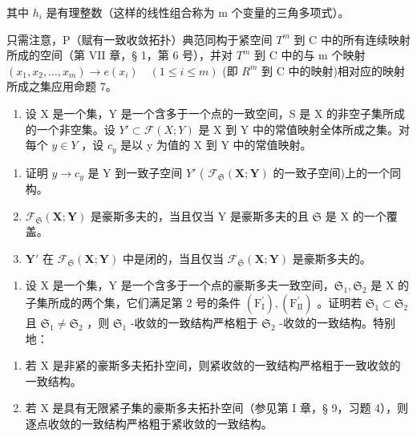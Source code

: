 其中 \(h_{i}\) 是有理整数（这样的线性组合称为 m 个变量的三角多项式）。

只需注意，P（赋有一致收敛拓扑）典范同构于紧空间 \(T^{m}\) 到 C 中的所有连续映射所成的空间（第 VII 章，§ 1，第 6 号），并对 \(T^{m}\) 到 C 中的与 m 个映射 \((x_{1}, x_{2}, \ldots, x_{m}) \to e(x_{i}) \quad (1 \leqslant i \leqslant m)\) (即 \(R^{m}\) 到 C 中的映射)相对应的映射所成之集应用命题 7。

\ExerciseGroupsStart

\ExerciseSection

\begin{enumerate}
\def\labelenumi{\arabic{enumi})}
\tightlist
\item
  设 X 是一个集，Y 是一个含多于一个点的一致空间，S 是 X 的非空子集所成的一个非空集。设 \(Y' \subset \mathcal{F}(X; Y)\) 是 X 到 Y 中的常值映射全体所成之集。对每个 \(y \in Y\) ，设 \(c_{y}\) 是以 y 为值的 X 到 Y 中的常值映射。
\end{enumerate}

\begin{enumerate}
\def\labelenumi{\alph{enumi})}
\item
  证明 \(y \to c_{y}\) 是 Y 到一致子空间 \(Y'\) ( \(\mathcal{F}_{\mathfrak{S}}(\mathbf{X}; \mathbf{Y})\) 的一致子空间)上的一个同构。
\item
  \(\mathcal{F}_{\mathfrak{S}}(\mathbf{X};\mathbf{Y})\) 是豪斯多夫的，当且仅当 Y 是豪斯多夫的且 \(\mathfrak{S}\) 是 X 的一个覆盖。
\item
  \(\mathbf{Y}'\) 在 \(\mathcal{F}_{\mathfrak{S}}(\mathbf{X};\mathbf{Y})\) 中是闭的，当且仅当 \(\mathcal{F}_{\mathfrak{S}}(\mathbf{X};\mathbf{Y})\) 是豪斯多夫的。
\end{enumerate}

\begin{enumerate}
\def\labelenumi{\arabic{enumi})}
\setcounter{enumi}{1}
\tightlist
\item
  设 X 是一个集，Y 是一个含多于一个点的豪斯多夫一致空间，\(\mathfrak{S}_1, \mathfrak{S}_2\) 是 X 的子集所成的两个集，它们满足第 2 号的条件 \((\mathrm{F}_{\mathrm{I}}^{\prime}), (\mathrm{F}_{\mathrm{II}}^{\prime})\) 。证明若 \(\mathfrak{S}_1 \subset \mathfrak{S}_2\) 且 \(\mathfrak{S}_1 \neq \mathfrak{S}_2\) ，则 \(\mathfrak{S}_1\) -收敛的一致结构严格粗于 \(\mathfrak{S}_2\) -收敛的一致结构。特别地：
\end{enumerate}

\begin{enumerate}
\def\labelenumi{(\roman{enumi})}
\item
  若 X 是非紧的豪斯多夫拓扑空间，则紧收敛的一致结构严格粗于一致收敛的一致结构。
\item
  若 X 是具有无限紧子集的豪斯多夫拓扑空间（参见第 I 章，§ 9，习题 4），则逐点收敛的一致结构严格粗于紧收敛的一致结构。
\end{enumerate}

